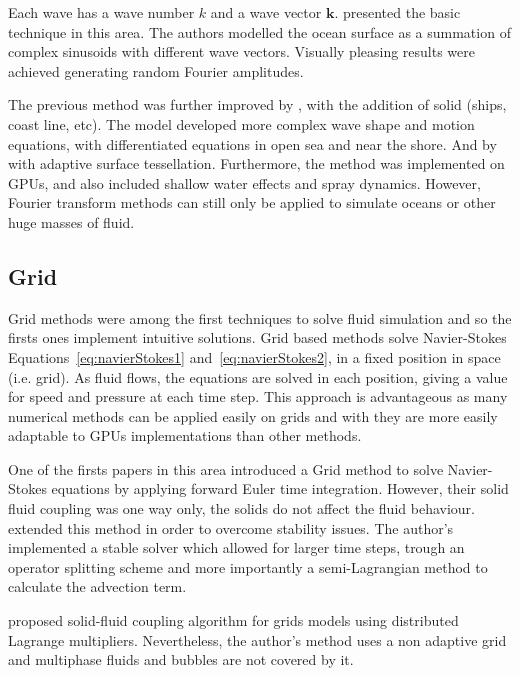 Each wave has a wave number $k$ and a wave vector $\mathbf{k}$.
\cite{Tessendorf2001} presented the basic technique in this area.
The authors modelled the ocean surface as a summation of complex sinusoids with different wave vectors.
Visually pleasing results were achieved generating random Fourier amplitudes.

The previous method was further improved by \cite{Cieutat2003}, with the addition of solid (ships, coast line, etc).
The model developed more complex wave shape and motion equations, with differentiated equations in open sea and near the shore.
And by \cite{Chiu2006} with adaptive surface tessellation.
Furthermore, the method was implemented on GPUs, and also included shallow water effects and spray dynamics.
However, Fourier transform methods can still only be applied to simulate oceans or other huge masses of fluid. 

\subsection{Grid}
\label{gridFluidSolvers}

Grid methods were among the first techniques to solve fluid simulation and so the firsts ones implement intuitive solutions.
Grid based methods solve Navier-Stokes Equations~\ref{eq:navierStokes1} and~\ref{eq:navierStokes2}, in a fixed position in space (i.e. grid).
As fluid flows, the equations are solved in each position, giving a value for speed and pressure at each time step.
This approach is advantageous as many numerical methods can be applied easily on grids and with they are more easily adaptable to GPUs implementations than other methods.

One of the firsts papers in this area introduced a Grid method \cite{Foster1996} to solve Navier-Stokes equations by applying forward Euler time integration.
However, their solid fluid coupling was one way only, the solids do not affect the fluid behaviour.
\cite{Stam1999} extended this method in order to overcome stability issues.
The author's implemented a stable solver which allowed for larger time steps, trough an operator splitting scheme and more importantly a semi-Lagrangian method to calculate the advection term.

\cite{Carlson2004} proposed solid-fluid coupling algorithm for grids models using distributed Lagrange multipliers.
Nevertheless, the author's method uses  a non adaptive grid and multiphase fluids and bubbles are not covered by it.

